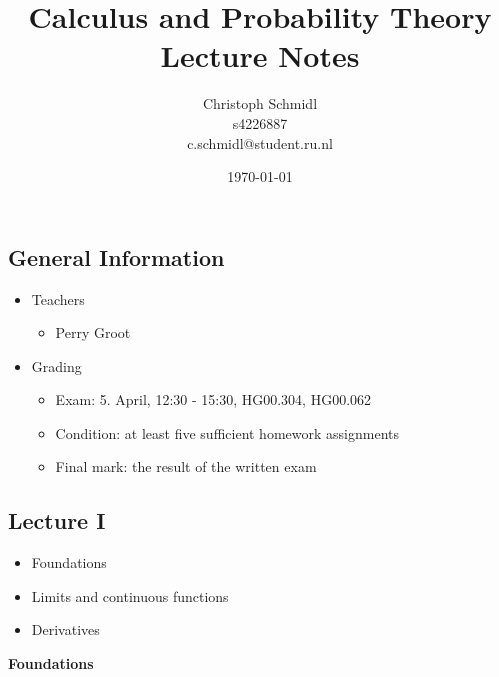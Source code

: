 \documentclass[a4paper]{article}
\title{Calculus and Probability Theory\\Lecture Notes}
\author{Christoph Schmidl\\
s4226887\\
c.schmidl@student.ru.nl}
\date{\today}
\begin{document}
\maketitle



\subsection*{General Information}

\begin{itemize}
	\item Teachers 
		\begin{itemize}
			\item Perry Groot
		\end{itemize}
\end{itemize}

\begin{itemize}
	\item Grading 
		\begin{itemize}
			\item Exam: 5. April, 12:30 - 15:30, HG00.304, HG00.062
			\item Condition: at least five sufficient homework assignments
			\item Final mark: the result of the written exam
		\end{itemize}
\end{itemize}




\subsection*{Lecture I}

\begin{itemize}
	\item Foundations
	\item Limits and continuous functions
	\item Derivatives
\end{itemize}

\textbf{Foundations}\\


\vspace{1em}
\end{document}
